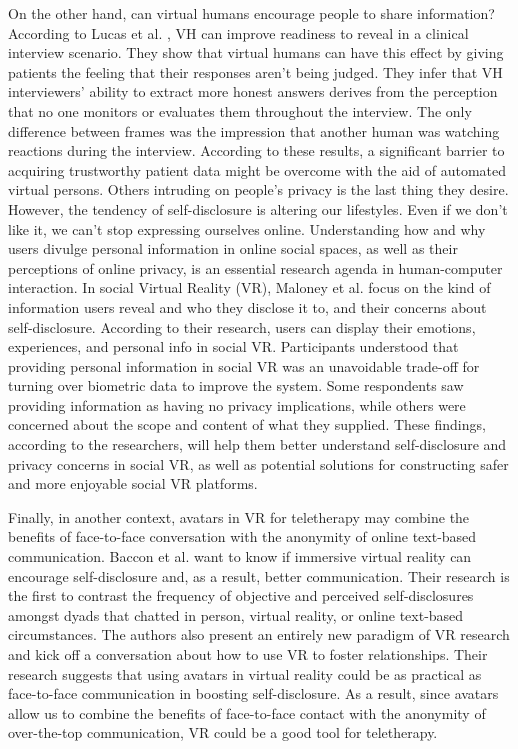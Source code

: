 On the other hand, can virtual humans encourage people to share information? According to Lucas et al. \cite{LUC14}, VH can improve readiness to reveal in a clinical interview scenario. They show that virtual humans can have this effect by giving patients the feeling that their responses aren't being judged. They infer that VH interviewers' ability to extract more honest answers derives from the perception that no one monitors or evaluates them throughout the interview. The only difference between frames was the impression that another human was watching reactions during the interview. According to these results, a significant barrier to acquiring trustworthy patient data might be overcome with the aid of automated virtual persons. Others intruding on people's privacy is the last thing they desire. However, the tendency of self-disclosure is altering our lifestyles. Even if we don't like it, we can't stop expressing ourselves online. Understanding how and why users divulge personal information in online social spaces, as well as their perceptions of online privacy, is an essential research agenda in human-computer interaction. In social Virtual Reality (VR), Maloney et al. \cite{MAL20} focus on the kind of information users reveal and who they disclose it to, and their concerns about self-disclosure. According to their research, users can display their emotions, experiences, and personal info in social VR. Participants understood that providing personal information in social VR was an unavoidable trade-off for turning over biometric data to improve the system. Some respondents saw providing information as having no privacy implications, while others were concerned about the scope and content of what they supplied. These findings, according to the researchers, will help them better understand self-disclosure and privacy concerns in social VR, as well as potential solutions for constructing safer and more enjoyable social VR platforms.

Finally, in another context, avatars in VR for teletherapy may combine the benefits of face-to-face conversation with the anonymity of online text-based communication. Baccon et al. \cite{BAC19} want to know if immersive virtual reality can encourage self-disclosure and, as a result, better communication. Their research is the first to contrast the frequency of objective and perceived self-disclosures amongst dyads that chatted in person, virtual reality, or online text-based circumstances. The authors also present an entirely new paradigm of VR research and kick off a conversation about how to use VR to foster relationships. Their research suggests that using avatars in virtual reality could be as practical as face-to-face communication in boosting self-disclosure. As a result, since avatars allow us to combine the benefits of face-to-face contact with the anonymity of over-the-top communication, VR could be a good tool for teletherapy.

